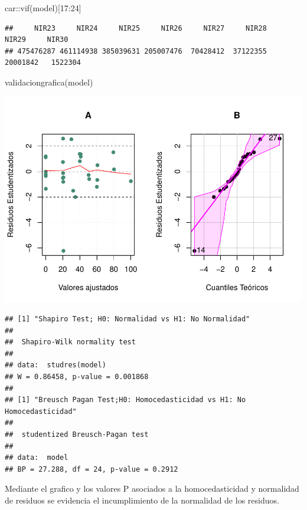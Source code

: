 \documentclass[
]{article}
\newenvironment{Shaded}{\begin{snugshade}}{\end{snugshade}}
\newcommand{\DecValTok}[1]{\textcolor[rgb]{0.00,0.00,0.81}{#1}}
\newcommand{\FunctionTok}[1]{\textcolor[rgb]{0.00,0.00,0.00}{#1}}
\newcommand{\NormalTok}[1]{#1}
\newcommand{\SpecialCharTok}[1]{\textcolor[rgb]{0.00,0.00,0.00}{#1}}
\begin{document}
\begin{Shaded}
\begin{Highlighting}[]
\NormalTok{car}\SpecialCharTok{::}\FunctionTok{vif}\NormalTok{(model)[}\DecValTok{17}\SpecialCharTok{:}\DecValTok{24}\NormalTok{]}
\end{Highlighting}
\end{Shaded}

\begin{verbatim}
##     NIR23     NIR24     NIR25     NIR26     NIR27     NIR28     NIR29     NIR30 
## 475476287 461114938 385039631 205007476  70428412  37122355  20001842   1522304
\end{verbatim}

\begin{Shaded}
\begin{Highlighting}[]
\FunctionTok{validaciongrafica}\NormalTok{(model)}
\end{Highlighting}
\end{Shaded}

\includegraphics{Taller-2-Regresion-Multiple-Aplicada_files/figure-latex/unnamed-chunk-4-1.pdf}

\begin{verbatim}
## [1] "Shapiro Test; H0: Normalidad vs H1: No Normalidad"
## 
##  Shapiro-Wilk normality test
## 
## data:  studres(model)
## W = 0.86458, p-value = 0.001868
## 
## [1] "Breusch Pagan Test;H0: Homocedasticidad vs H1: No Homocedasticidad"
## 
##  studentized Breusch-Pagan test
## 
## data:  model
## BP = 27.288, df = 24, p-value = 0.2912
\end{verbatim}

Mediante el grafico y los valores P asociados a la homocedasticidad y
normalidad de residuos se evidencia el incumplimiento de la normalidad
de los residuos.
\end{document}
